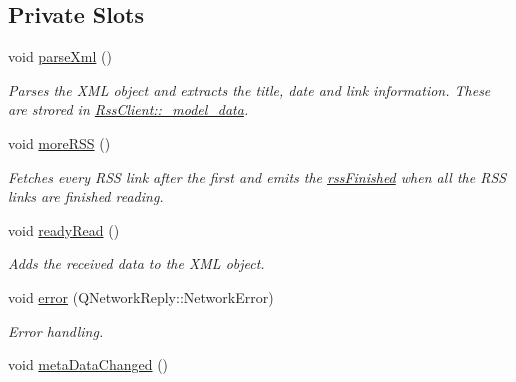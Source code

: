 \subsection*{Private Slots}
\begin{DoxyCompactItemize}
\item 
\hypertarget{class_rss_client_a6ef58c1b978fff1e437d07916b9d5ffb}{void \hyperlink{class_rss_client_a6ef58c1b978fff1e437d07916b9d5ffb}{parse\+Xml} ()}\label{class_rss_client_a6ef58c1b978fff1e437d07916b9d5ffb}

\begin{DoxyCompactList}\small\item\em Parses the X\+M\+L object and extracts the title, date and link information. These are strored in \hyperlink{class_rss_client_ab7a26f3940ef8106cb3cfd81f2e37635}{Rss\+Client\+::\+\_\+model\+\_\+data}. \end{DoxyCompactList}\item 
\hypertarget{class_rss_client_a280dfdaa7e4c1be4cf804c9c8f6f0cd4}{void \hyperlink{class_rss_client_a280dfdaa7e4c1be4cf804c9c8f6f0cd4}{more\+R\+S\+S} ()}\label{class_rss_client_a280dfdaa7e4c1be4cf804c9c8f6f0cd4}

\begin{DoxyCompactList}\small\item\em Fetches every R\+S\+S link after the first and emits the \hyperlink{class_rss_client_ab6d60bfd93285070055f5abddc4e3804}{rss\+Finished} when all the R\+S\+S links are finished reading. \end{DoxyCompactList}\item 
\hypertarget{class_rss_client_a6173e6e7b14eb6a7116e7341ea255015}{void \hyperlink{class_rss_client_a6173e6e7b14eb6a7116e7341ea255015}{ready\+Read} ()}\label{class_rss_client_a6173e6e7b14eb6a7116e7341ea255015}

\begin{DoxyCompactList}\small\item\em Adds the received data to the X\+M\+L object. \end{DoxyCompactList}\item 
\hypertarget{class_rss_client_a91d08eb4371ad934aee0a97d0701bc0b}{void \hyperlink{class_rss_client_a91d08eb4371ad934aee0a97d0701bc0b}{error} (Q\+Network\+Reply\+::\+Network\+Error)}\label{class_rss_client_a91d08eb4371ad934aee0a97d0701bc0b}

\begin{DoxyCompactList}\small\item\em Error handling. \end{DoxyCompactList}\item 
\hypertarget{class_rss_client_a9bd0db5161f3e7b64a9585ea56a0b235}{void \hyperlink{class_rss_client_a9bd0db5161f3e7b64a9585ea56a0b235}{meta\+Data\+Changed} ()}\label{class_rss_client_a9bd0db5161f3e7b64a9585ea56a0b235}


\end{DoxyCompactItemize}
